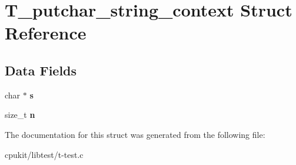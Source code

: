 \hypertarget{structT__putchar__string__context}{}\section{T\+\_\+putchar\+\_\+string\+\_\+context Struct Reference}
\label{structT__putchar__string__context}
\subsection*{Data Fields}
\begin{DoxyCompactItemize}
\item 
\mbox{\label{structT__putchar__string__context_ab92721a1f4cc7a2726330b81cb1d82d3}} 
char $\ast$ {\bfseries s}
\item 
\mbox{\label{structT__putchar__string__context_a670aee71d9f9c804fa465359bff9f84e}} 
size\+\_\+t {\bfseries n}
\end{DoxyCompactItemize}


The documentation for this struct was generated from the following file\+:\begin{DoxyCompactItemize}
\item 
cpukit/libtest/t-\/test.\+c\end{DoxyCompactItemize}
